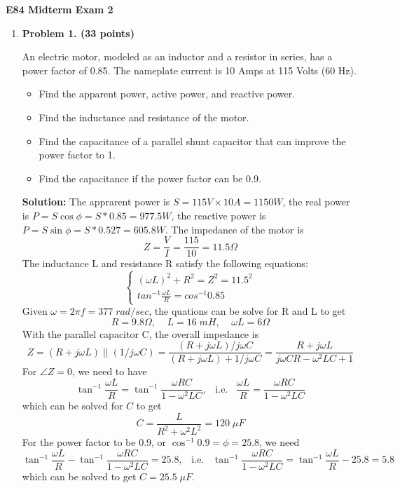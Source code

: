 \usepackage{html}

\begin{center}
{\Large \bf E84 Midterm Exam 2}
\end{center}


\begin{enumerate}

\item {\bf Problem 1. (33 points)} 

  An electric motor, modeled as an inductor and a resistor in series, has 
  a power factor of 0.85. The nameplate current is 10 Amps at 115 Volts 
  (60 Hz). 
  \begin{itemize}
  \item Find the apparent power, active power, and reactive power. 
  \item Find the inductance and resistance of the motor.
  \item Find the capacitance of a parallel shunt capacitor that can improve
    the power factor to 1.
  \item Find the capacitance if the power factor can be 0.9.
  \end{itemize}

  {\bf Solution:} 
  The apprarent power is $S=115V \times 10A = 1150 W$, the real power is
  $P=S\cos \phi=S*0.85=977.5 W$, the reactive power is 
  $P=S\sin \phi=S*0.527=605.8 W$. The impedance of the motor is
  \[	Z=\frac{V}{I}=\frac{115}{10}=11.5\Omega \]
  The inductance L and resistance R satisfy the following equations:
  \[ \left\{ \begin{array}{l} (\omega L)^2+R^2=Z^2=11.5^2 \\
    tan^{-1} \frac{\omega L}{R}=cos^{-1} 0.85 \end{array} \right. \]
  Given $\omega=2\pi f=377\;rad/sec$, the quations can be solve for R and
  L to get
  \[	R=9.8\Omega,\;\;\;\;L=16\;mH,\;\;\;\;\omega L=6\Omega	\]
  With the parallel capacitor C, the overall impedance is
  \[	Z=(R+j\omega L)\; || \;(1/j\omega C)
  =\frac{(R+j\omega L)/j\omega C}{(R+j\omega L)+1/j\omega C}
  =\frac{R+j\omega L}{j\omega CR-\omega^2 LC+1}	\]
  For $\angle Z=0$, we need to have
  \[ \tan^{-1}\frac{\omega L}{R}=\tan^{-1}\frac{\omega RC}{1-\omega^2 LC},
  \;\;\;\mbox{i.e.}\;\;\;	
  \frac{\omega L}{R}=\frac{\omega RC}{1-\omega^2 LC}	\]
  which can be solved for $C$ to get
  \[	C=\frac{L}{R^2+\omega^2 L^2}=120\;\mu F	\]
  For the power factor to be 0.9, or $\cos^{-1} 0.9=\phi=25.8$, we need
  \[ \tan^{-1}\frac{\omega L}{R}-\tan^{-1}\frac{\omega RC}{1-\omega^2 LC}
  =25.8,	\;\;\;\mbox{i.e.}\;\;\;	
  \tan^{-1}\frac{\omega RC}{1-\omega^2 LC}=\tan^{-1}\frac{\omega L}{R}-25.8=
  5.8 \]
 which can be solved to get $C=25.5\;\mu F$.


\end{enumerate}
